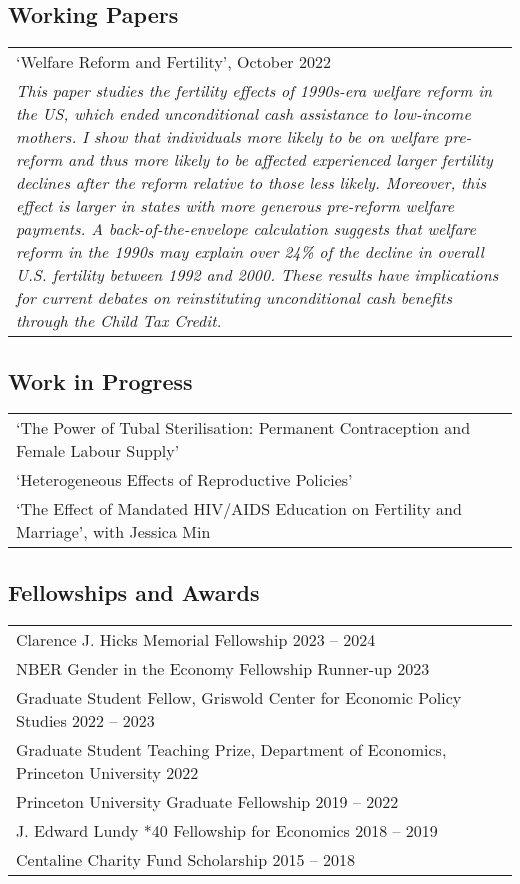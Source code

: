 \documentclass[letterpaper]{article}
\begin{document}
\subsection*{Working Papers}
\begin{tabularx}{\textwidth}{X}
`Welfare Reform and Fertility', October 2022\\ [0.5em]
\textit{This paper studies the fertility effects of 1990s-era welfare reform in the US, which ended unconditional cash assistance to low-income mothers. I show that individuals more likely to be on welfare pre-reform and thus more likely to be affected experienced larger fertility declines after the reform relative to those less likely. Moreover, this effect is larger in states with more generous pre-reform welfare payments. A back-of-the-envelope calculation suggests that welfare reform in the 1990s may explain over 24\% of the decline in overall U.S. fertility between 1992 and 2000. These results have implications for current debates on reinstituting unconditional cash benefits through the Child Tax Credit.}
\end{tabularx}

\subsection*{Work in Progress}
\begin{tabularx}{\textwidth}{X}
`The Power of Tubal Sterilisation: Permanent Contraception and Female Labour Supply'\\ [0.5em]
`Heterogeneous Effects of Reproductive Policies'\\ [0.5em]
`The Effect of Mandated HIV/AIDS Education on Fertility and Marriage', with Jessica Min\\ [0.5em]
\end{tabularx}

\subsection*{Fellowships and Awards}
\begin{tabularx}{\textwidth}{X}
Clarence J. Hicks Memorial Fellowship \hfill 2023 -- 2024 \\ [0.5em]
NBER Gender in the Economy Fellowship Runner-up \hfill 2023 \\ [0.5em]
Graduate Student Fellow, Griswold Center for Economic Policy Studies \hfill 2022 -- 2023 \\ [0.5em]
Graduate Student Teaching Prize, Department of Economics, Princeton University \hfill 2022 \\ [0.5em]
Princeton University Graduate Fellowship \hfill 2019 -- 2022 \\ [0.5em]
J. Edward Lundy *40 Fellowship for Economics \hfill 2018 -- 2019 \\ [0.5em]
Centaline Charity Fund Scholarship \hfill 2015 -- 2018 \\
\end{tabularx}
\end{document}
